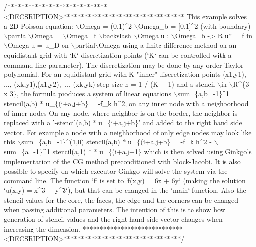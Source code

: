 {\begin{DoxyCodeInclude}
\textcolor{comment}{/*****************************<DECSRIPTION>***********************************}
\textcolor{comment}{This example solves a 2D Poisson equation:}
\textcolor{comment}{}
\textcolor{comment}{    \(\backslash\)Omega = (0,1)^2}
\textcolor{comment}{    \(\backslash\)Omega\_b = [0,1]^2   (with boundary)}
\textcolor{comment}{    \(\backslash\)partial\(\backslash\)Omega = \(\backslash\)Omega\_b \(\backslash\)backslash \(\backslash\)Omega}
\textcolor{comment}{    u : \(\backslash\)Omega\_b -> R}
\textcolor{comment}{    u'' = f in \(\backslash\)Omega}
\textcolor{comment}{    u = u\_D on \(\backslash\)partial\(\backslash\)Omega}
\textcolor{comment}{}
\textcolor{comment}{using a finite difference method on an equidistant grid with `K` discretization}
\textcolor{comment}{points (`K` can be controlled with a command line parameter). The discretization}
\textcolor{comment}{may be done by any order Taylor polynomial.}
\textcolor{comment}{For an equidistant grid with K "inner" discretization points (x1,y1), ...,}
\textcolor{comment}{(xk,y1),(x1,y2), ..., (xk,yk) step size h = 1 / (K + 1) and a stencil \(\backslash\)in}
\textcolor{comment}{\(\backslash\)R^\{3 x 3\}, the formula produces a system of linear equations}
\textcolor{comment}{}
\textcolor{comment}{\(\backslash\)sum\_\{a,b=-1\}^1 stencil(a,b) * u\_\{(i+a,j+b\} = -f\_k h^2,  on any inner node with}
\textcolor{comment}{a neighborhood of inner nodes}
\textcolor{comment}{}
\textcolor{comment}{On any node, where neighbor is on the border, the neighbor is replaced with a}
\textcolor{comment}{'-stencil(a,b) * u\_\{i+a,j+b\}' and added to the right hand side vector. For}
\textcolor{comment}{example a node with a neighborhood of only edge nodes may look like this}
\textcolor{comment}{}
\textcolor{comment}{\(\backslash\)sum\_\{a,b=-1\}^(1,0) stencil(a,b) * u\_\{(i+a,j+b\} = -f\_k h^2 - \(\backslash\)sum\_\{a=-1\}^1}
\textcolor{comment}{stencil(a,1) * * u\_\{(i+a,j+1\}}
\textcolor{comment}{}
\textcolor{comment}{which is then solved using Ginkgo's implementation of the CG method}
\textcolor{comment}{preconditioned with block-Jacobi. It is also possible to specify on which}
\textcolor{comment}{executor Ginkgo will solve the system via the command line.}
\textcolor{comment}{The function `f` is set to `f(x,y) = 6x + 6y` (making the solution `u(x,y) = x^3}
\textcolor{comment}{+ y^3`), but that can be changed in the `main` function. Also the stencil values}
\textcolor{comment}{for the core, the faces, the edge and the corners can be changed when passing}
\textcolor{comment}{additional parameters.}
\textcolor{comment}{}
\textcolor{comment}{The intention of this is to show how generation of stencil values and the right}
\textcolor{comment}{hand side vector changes when increasing the dimension.}
\textcolor{comment}{*****************************<DECSRIPTION>**********************************/}


\end{DoxyCodeInclude}}
